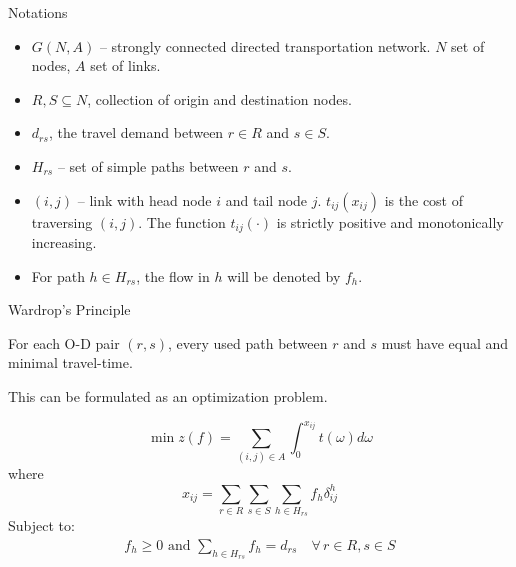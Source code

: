 \documentclass{beamer}
\begin{document}
\begin{frame}{Notations}
\begin{itemize}
    \item $G(N,A)$ -- strongly connected directed transportation network.
    $N$ set of nodes, $A$ set of links.

    \item $R, S\subseteq N$, collection of origin and destination nodes.

    \item $d_{rs}$, the travel demand between $r\in R$ and $s\in S$.

    \item $H_{rs}$ -- set of simple paths between $r$ and $s$.

    \item $(i,j)$ -- link with head node $i$ and tail node $j$.
    $t_{ij}(x_{ij})$ is the cost of traversing $(i,j)$. The
    function $t_{ij}(\cdot)$ is strictly positive and monotonically
    increasing.

    \item For path $h\in H_{rs}$, the flow in $h$ will be
    denoted by $f_h$.
\end{itemize}
\end{frame}

\begin{frame}{Wardrop's Principle}
\begin{definition}[UE-Condition]
    For each O-D pair $(r,s)$, every used path between $r$ and
    $s$ must have equal and minimal travel-time.
\end{definition}

\pause

This can be formulated as an optimization problem.

\[
    \min z(f) = \sum_{(i,j)\in A} \int_0^{
    x_{ij}
    } t(\omega)d\omega
\]
where
\[
    x_{ij} = \sum_{r\in R}\sum_{s\in S}\sum_{h\in H_{rs}}f_h
    \delta_{ij}^h
\]
Subject to:
\[
\begin{split}
    f_h\geq 0 \text{ and }\sum_{h\in H_{rs}} f_h = d_{rs}\quad \forall\, r\in R,s\in S
\end{split}
\]
\end{frame}
\end{document}
